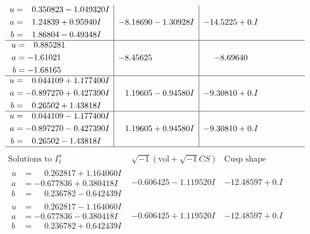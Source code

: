 \documentclass[1p]{elsarticle_modified}
\theoremstyle{definition}
\newcommand{\I}{\sqrt{-1}}
\begin{document}
$$\begin{array}{c|c|c}
\begin{aligned}
u &= \phantom{-}0.350823 - 1.049320 I \\
a &= \phantom{-}1.24839 + 0.95940 I \\
b &= \phantom{-}1.86804 - 0.49348 I\end{aligned}
 & -8.18690 - 1.30928 I & -14.5225 + 0. I\phantom{ +0.000000I} \\ \hline\begin{aligned}
u &= \phantom{-}0.885281\phantom{ +0.000000I} \\
a &= -1.61021\phantom{ +0.000000I} \\
b &= -1.68165\phantom{ +0.000000I}\end{aligned}
 & -8.45625\phantom{ +0.000000I} & -8.69640\phantom{ +0.000000I} \\ \hline\begin{aligned}
u &= \phantom{-}0.044109 + 1.177400 I \\
a &= -0.897270 + 0.427390 I \\
b &= \phantom{-}0.26502 + 1.43818 I\end{aligned}
 & \phantom{-}1.19605 - 0.94580 I & -9.30810 + 0. I\phantom{ +0.000000I} \\ \hline\begin{aligned}
u &= \phantom{-}0.044109 - 1.177400 I \\
a &= -0.897270 - 0.427390 I \\
b &= \phantom{-}0.26502 - 1.43818 I\end{aligned}
 & \phantom{-}1.19605 + 0.94580 I & -9.30810 + 0. I\phantom{ +0.000000I}\\
 \hline 
 \end{array}$$\newpage$$\begin{array}{c|c|c}  
\text{Solutions to }I^u_{1}& \I (\text{vol} + \sqrt{-1}CS) & \text{Cusp shape}\\
 \hline 
\begin{aligned}
u &= \phantom{-}0.262817 + 1.164060 I \\
a &= -0.677836 + 0.380418 I \\
b &= \phantom{-}0.236782 - 0.642439 I\end{aligned}
 & -0.606425 - 1.119520 I & -12.48597 + 0. I\phantom{ +0.000000I} \\ \hline\begin{aligned}
u &= \phantom{-}0.262817 - 1.164060 I \\
a &= -0.677836 - 0.380418 I \\
b &= \phantom{-}0.236782 + 0.642439 I\end{aligned}
 & -0.606425 + 1.119520 I & -12.48597 + 0. I\phantom{ +0.000000I} \\ \hline\begin{aligned}

\end{aligned}
\end{array}$$
\end{document}
